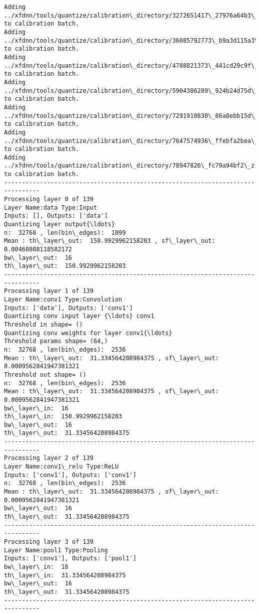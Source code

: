 \documentclass[11pt]{article}
\begin{document}
    \begin{Verbatim}[commandchars=\\\{\}]
Adding ../xfdnn/tools/quantize/calibration\_directory/3272651417\_27976a64b3\_z.jpg to calibration batch.
Adding ../xfdnn/tools/quantize/calibration\_directory/36085792773\_b9a3d115a3\_z.jpg to calibration batch.
Adding ../xfdnn/tools/quantize/calibration\_directory/4788821373\_441cd29c9f\_z.jpg to calibration batch.
Adding ../xfdnn/tools/quantize/calibration\_directory/5904386289\_924b24d75d\_z.jpg to calibration batch.
Adding ../xfdnn/tools/quantize/calibration\_directory/7291910830\_86a8ebb15d\_z.jpg to calibration batch.
Adding ../xfdnn/tools/quantize/calibration\_directory/7647574936\_ffebfa2bea\_z.jpg to calibration batch.
Adding ../xfdnn/tools/quantize/calibration\_directory/78947826\_fc79a94bf2\_z.jpg to calibration batch.
--------------------------------------------------------------------------------
Processing layer 0 of 139
Layer Name:data Type:Input
Inputs: [], Outputs: ['data']
Quantizing layer output{\ldots}
n:  32768 , len(bin\_edges):  1099
Mean : th\_layer\_out:  150.9929962158203 , sf\_layer\_out:  0.00460808118582172
bw\_layer\_out:  16
th\_layer\_out:  150.9929962158203
--------------------------------------------------------------------------------
Processing layer 1 of 139
Layer Name:conv1 Type:Convolution
Inputs: ['data'], Outputs: ['conv1']
Quantizing conv input layer {\ldots} conv1
Threshold in shape= ()
Quantizing conv weights for layer conv1{\ldots}
Threshold params shape= (64,)
n:  32768 , len(bin\_edges):  2536
Mean : th\_layer\_out:  31.334564208984375 , sf\_layer\_out:  0.0009562841947381321
Threshold out shape= ()
n:  32768 , len(bin\_edges):  2536
Mean : th\_layer\_out:  31.334564208984375 , sf\_layer\_out:  0.0009562841947381321
bw\_layer\_in:  16
th\_layer\_in:  150.9929962158203
bw\_layer\_out:  16
th\_layer\_out:  31.334564208984375
--------------------------------------------------------------------------------
Processing layer 2 of 139
Layer Name:conv1\_relu Type:ReLU
Inputs: ['conv1'], Outputs: ['conv1']
n:  32768 , len(bin\_edges):  2536
Mean : th\_layer\_out:  31.334564208984375 , sf\_layer\_out:  0.0009562841947381321
bw\_layer\_out:  16
th\_layer\_out:  31.334564208984375
--------------------------------------------------------------------------------
Processing layer 3 of 139
Layer Name:pool1 Type:Pooling
Inputs: ['conv1'], Outputs: ['pool1']
bw\_layer\_in:  16
th\_layer\_in:  31.334564208984375
bw\_layer\_out:  16
th\_layer\_out:  31.334564208984375
--------------------------------------------------------------------------------

\end{Verbatim}
\end{document}
